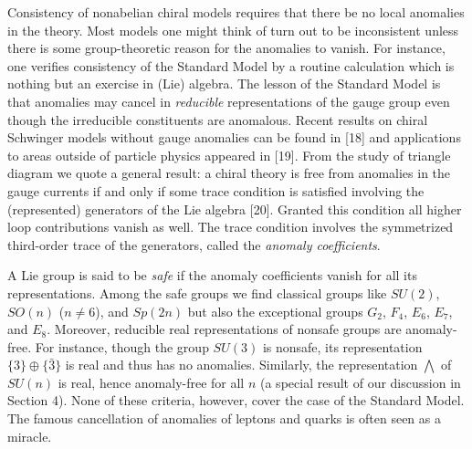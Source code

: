 \documentclass[11pt,a4paper]{article}
\newcommand{\bw}{{\textstyle\bigwedge}}
\begin{document}
Consistency of nonabelian chiral models requires that there be no local 
anomalies in 
the theory. Most models one might think of turn out to be inconsistent 
unless there is some group-theoretic reason for the anomalies to vanish.
For instance, one verifies consistency of the Standard Model 
by a routine calculation which is nothing but an exercise in (Lie) algebra.
The lesson of the Standard Model is that anomalies may cancel in
{\em reducible\/} representations of the gauge group even though the
irreducible constituents are anomalous. 
Recent results on chiral Schwinger models without gauge anomalies can be
found in [18] and applications to areas outside of particle physics appeared
in [19]. From the study of triangle diagram we
quote a general result: a chiral theory is free from anomalies in the
gauge currents if and only if some trace condition is satisfied involving 
the (represented) generators of the Lie algebra [20]. Granted this condition
all higher loop contributions vanish as well. The trace condition involves
the symmetrized third-order trace of the generators, called the {\em anomaly
coefficients}.

A Lie group is said to be {\em safe} if the anomaly coefficients vanish for
all its representations. Among the safe groups we find classical groups like
$SU(2)$, $SO(n)$ ($n\ne6$), and $Sp(2n)$ but also the exceptional groups
$G_2$, $F_4$, $E_6$, $E_7$, and $E_8$. Moreover, reducible real 
representations of nonsafe groups are anomaly-free. For instance, though 
the group $SU(3)$ is nonsafe, its representation $\{3\}\oplus\{\bar{3}\}$ is
real and thus has no anomalies. Similarly, the representation $\bw$ of
$SU(n)$ is real, hence anomaly-free for all $n$ (a special result of our
discussion in Section 4). None of these criteria, however, cover the case of 
the Standard Model. The famous cancellation of anomalies of leptons and quarks
is often seen as a miracle.
\end{document}
